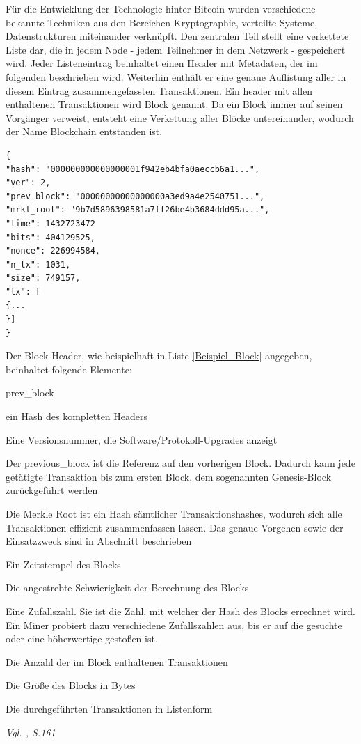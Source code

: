 Für die Entwicklung der Technologie hinter Bitcoin wurden verschiedene bekannte Techniken aus den Bereichen Kryptographie, verteilte Systeme, Datenstrukturen miteinander verknüpft. Den zentralen Teil stellt eine verkettete Liste dar, die in jedem Node - jedem Teilnehmer in dem Netzwerk - gespeichert wird. Jeder Listeneintrag beinhaltet einen Header mit Metadaten, der im folgenden beschrieben wird. Weiterhin enthält er eine genaue Auflistung aller in diesem Eintrag zusammengefassten Transaktionen. Ein header mit allen enthaltenen Transaktionen wird Block genannt. Da ein Block immer auf seinen Vorgänger verweist, entsteht eine Verkettung aller Blöcke untereinander, wodurch der Name Blockchain entstanden ist.\\

\begin{lstlisting}[language=html, caption=Ein beispielhafter Block-Header \cite{Webbtc.2015} \label{Beispiel_Block}]
{
"hash": "000000000000000001f942eb4bfa0aeccb6a1...",
"ver": 2,
"prev_block": "00000000000000000a3ed9a4e2540751...",
"mrkl_root": "9b7d5896398581a7ff26be4b3684ddd95a...",
"time": 1432723472
"bits": 404129525,
"nonce": 226994584,
"n_tx": 1031,
"size": 749157,
"tx": [
{...
}]
}
\end{lstlisting}

Der Block-Header, wie beispielhaft in Liste \ref{Beispiel_Block} angegeben, beinhaltet folgende Elemente:\\


\begin{labeling}{prev\_block}
	\item[hash] ein Hash des kompletten Headers
	\item[ver] Eine Versionsnummer, die Software/Protokoll-Upgrades anzeigt
	\item[prev\_block] Der previous\_block ist die Referenz auf den vorherigen Block. Dadurch kann jede getätigte Transaktion bis zum ersten Block, dem sogenannten Genesis-Block zurückgeführt werden
	\item[mrkl\_root] Die Merkle Root ist ein Hash sämtlicher Transaktionshashes, wodurch sich alle Transaktionen effizient zusammenfassen lassen. Das genaue Vorgehen sowie der Einsatzzweck sind in Abschnitt beschrieben
	\item[time] Ein Zeitstempel des Blocks
	\item[bits] Die angestrebte Schwierigkeit der Berechnung des Blocks
	\item[nonce] Eine Zufallszahl. Sie ist die Zahl, mit welcher der Hash des Blocks errechnet wird. Ein Miner probiert dazu verschiedene Zufallszahlen aus, bis er auf die gesuchte oder eine höherwertige gestoßen ist.
	\item[n\_tx] Die Anzahl der im Block enthaltenen Transaktionen
	\item[size] Die Größe des Blocks in Bytes
	\item[tx] Die durchgeführten Transaktionen in Listenform
\end{labeling}
\textit{Vgl. \citet{Antonopoulos.2015}, S.161}

